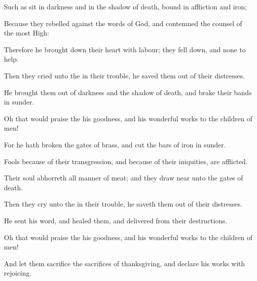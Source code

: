 {\Q {}Such as
sit in
darkness and in the shadow of
death,
{}
bound in
affliction and
iron;


\par }{\Q {}Because they
rebelled against the
words of
God, and
contemned the
counsel of the most
High:


\par }{\Q {}Therefore he brought
down their
heart with
labour; they fell
down, and
{} none to
help.


\par }{\Q {}Then they
cried unto the
{} in their
trouble,
{} he
saved them out of their
distresses.


\par }{\Q {}He brought them
out of
darkness and the shadow of
death, and
brake their
bands in
sunder.


\par }{\Q {}Oh that
{} would
praise the
{}
{} his
goodness, and
{} his wonderful
works to the
children of
men!


\par }{\Q {}For he hath
broken the
gates of
brass, and
cut the
bars of
iron in
sunder.


\par }{\BB \par }
{\Q {}Fools
because of their
transgression, and because of their
iniquities, are
afflicted.


\par }{\Q {}Their
soul
abhorreth all manner of
meat; and they draw
near unto the
gates of
death.


\par }{\Q {}Then they
cry unto the
{} in their
trouble,
{} he
saveth them out of their
distresses.


\par }{\Q {}He
sent his
word, and
healed them, and
delivered
{} from their
destructions.


\par }{\Q {}Oh that
{} would
praise the
{}
{} his
goodness, and
{} his wonderful
works to the
children of
men!


\par }{\Q {}And let them
sacrifice the
sacrifices of
thanksgiving, and
declare his
works with
rejoicing.


\par }{\BB \par }
